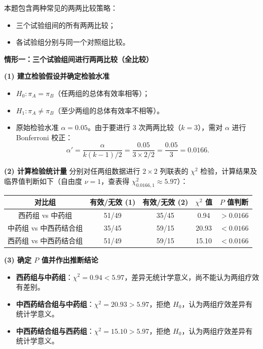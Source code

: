 \documentclass[lang=cn,10pt]{elegantbook}
\begin{document}
\begin{solution}
本题包含两种常见的两两比较策略：
\begin{itemize}
    \item 三个试验组间的所有两两比较；
    \item 各试验组分别与同一个对照组比较。
\end{itemize}

\bigskip
\textbf{情形一：三个试验组间进行两两比较（全比较）}

\textbf{(1) 建立检验假设并确定检验水准}
\begin{itemize}
    \item $H_0: \pi_A = \pi_B$（任两组的总体有效率相等）；
    \item $H_1: \pi_A \neq \pi_B$（至少两组的总体有效率不相等）。
    \item 原始检验水准 $\alpha = 0.05$。由于要进行 3 次两两比较（$k=3$），需对 $\alpha$ 进行 Bonferroni 校正：
    \[
    \alpha' = \frac{\alpha}{k(k-1)/2} = \frac{0.05}{3 \times 2 / 2} = \frac{0.05}{3} = 0.0166.
    \]
\end{itemize}

\textbf{(2) 计算检验统计量}
分别对任两组数据进行 $2 \times 2$ 列联表的 $\chi^2$ 检验，计算结果及临界值判断如下（自由度 $\nu=1$，查表得 $\chi^2_{0.0166,1} \approx 5.97$）：

\begin{center}
\begin{tabular}{ccccc}
  \hline
  对比组 & 有效/无效 (1) & 有效/无效 (2) & $\chi^2$ 值 & $P$ 值判断 \\
  \hline
  西药组 vs 中药组 & 51/49 & 35/45 & 0.94 & $>0.0166$ \\
  中药组 vs 中西药结合组 & 35/45 & 59/15 & 20.93 & $<0.0166$ \\
  西药组 vs 中西药结合组 & 51/49 & 59/15 & 15.10 & $<0.0166$ \\
  \hline
\end{tabular}
\end{center}

\textbf{(3) 确定 $P$ 值并作出推断结论}
\begin{itemize}
    \item \textbf{西药组与中药组}：$\chi^2 = 0.94 < 5.97$，差异无统计学意义，尚不能认为两组疗效有差别。
    \item \textbf{中西药结合组与中药组}：$\chi^2 = 20.93 > 5.97$，拒绝 $H_0$，认为两组疗效差异有统计学意义。
    \item \textbf{中西药结合组与西药组}：$\chi^2 = 15.10 > 5.97$，拒绝 $H_0$，认为两组疗效差异有统计学意义。
\end{itemize}


\end{solution}
\end{document}
